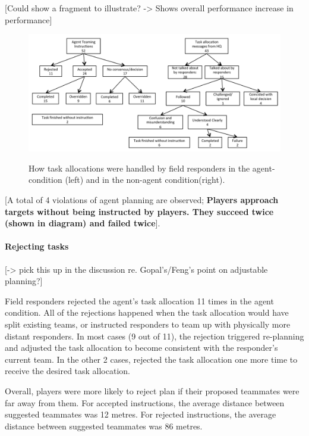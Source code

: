 [Could show a fragment to illustrate? -> Shows overall performance increase in performance]


\begin{figure}[htbp]
\includegraphics[width=\columnwidth]{message_handling.png}
\label{fig:msgs}
\caption{How task allocations were handled by field responders in the agent-condition (left) and in the non-agent condition(right).}
\end{figure}

[A total of 4 violations of agent planning are observed; \textbf{Players approach targets without being instructed by players. They succeed twice (shown in diagram) and failed twice}]. 

\paragraph{Rejecting tasks}
[-> pick this up in the discussion re. Gopal's/Feng's point on adjustable planning?]

Field responders rejected the agent's task allocation 11 times in the agent condition. All of the rejections happened when the task allocation would have split existing teams, or instructed responders to team up with physically more distant responders. In most cases (9 out of 11), the rejection triggered re-planning and adjusted the task allocation to become consistent with the responder's current team. In the other 2 cases, rejected the task allocation one more time to receive the desired task allocation. 

Overall, players were more likely to reject plan if their proposed teammates were far away from them. For accepted instructions, the average distance between suggested teammates was 12 metres. For rejected instructions, the average distance between suggested teammates was 86 metres.

